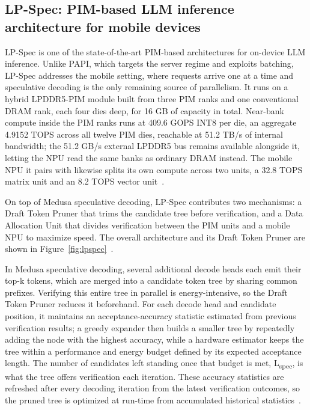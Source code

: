 \documentclass[11pt]{article}
\begin{document}
\subsection{LP-Spec: PIM-based LLM inference architecture for mobile devices}\label{subsec:lpspec}
LP-Spec is one of the state-of-the-art PIM-based architectures for on-device LLM inference. Unlike PAPI, which targets the server regime and exploits batching, LP-Spec addresses the mobile setting, where requests arrive one at a time and speculative decoding is the only remaining source of parallelism. It runs on a hybrid LPDDR5-PIM module built from three PIM ranks and one conventional DRAM rank, each four dies deep, for 16 GB of capacity in total. Near-bank compute inside the PIM ranks runs at 409.6 GOPS INT8 per die, an aggregate 4.9152 TOPS across all twelve PIM dies, reachable at 51.2 TB/s of internal bandwidth; the 51.2 GB/s external LPDDR5 bus remains available alongside it, letting the NPU read the same banks as ordinary DRAM instead. The mobile NPU it pairs with likewise splits its own compute across two units, a 32.8 TOPS matrix unit and an 8.2 TOPS vector unit~\cite{he2025lpspec}.

On top of Medusa speculative decoding, LP-Spec contributes two mechanisms: a Draft Token Pruner that trims the candidate tree before verification, and a Data Allocation Unit that divides verification between the PIM units and a mobile NPU to maximize speed. The overall architecture and its Draft Token Pruner are shown in Figure~\ref{fig:lpspec}~\cite{he2025lpspec}.

In Medusa speculative decoding, several additional decode heads each emit their top-k tokens, which are merged into a candidate token tree by sharing common prefixes. Verifying this entire tree in parallel is energy-intensive, so the Draft Token Pruner reduces it beforehand. For each decode head and candidate position, it maintains an acceptance-accuracy statistic estimated from previous verification results; a greedy expander then builds a smaller tree by repeatedly adding the node with the highest accuracy, while a hardware estimator keeps the tree within a performance and energy budget defined by its expected acceptance length. The number of candidates left standing once that budget is met, L\textsubscript{spec}, is what the tree offers verification each iteration. These accuracy statistics are refreshed after every decoding iteration from the latest verification outcomes, so the pruned tree is optimized at run-time from accumulated historical statistics~\cite{he2025lpspec}.
\end{document}
